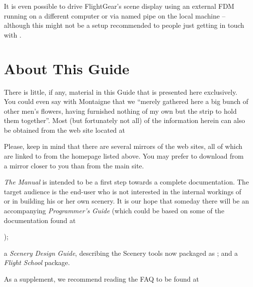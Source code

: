 It is even possible to drive FlightGear's scene display using an external
FDM running on a different computer or via named
pipe on the local machine -- although this might not be a
setup recommended to people just getting in touch with \FlightGear.


\section{About This Guide}

There is little, if any, material in this Guide that is presented here exclusively. You
could even say with Montaigne that we ``merely gathered here a big bunch of other men's
flowers, having furnished nothing of my own but the strip to hold them together''. Most
(but fortunately not all) of the information herein can also be obtained from the
\FlightGear{} web site located at
\medskip

\medskip

Please, keep in mind that there are several mirrors of the \FlightGear{} web sites, all
of which are linked to from the \FlightGear{} homepage listed above.
You may prefer to download \FlightGear{} from a mirror closer to you than from the
main site.

\textit{The \FlightGear{} Manual} is intended to be a first step
towards a complete \FlightGear{} documentation. The target audience is the end-user who is not
interested in the internal workings of  or in building
his or her own scenery. It is our hope that someday there will be an
accompanying \textit{\FlightGear{} Programmer's Guide} (which could be based on some of the documentation
found at
 \medskip

);
 \medskip

 \noindent
a \textit{\FlightGear{} Scenery Design Guide},
describing the Scenery tools now packaged as \TerraGear{}; and a \textit{\FlightGear{}
Flight School} package.
 \medskip

As a supplement, we recommend reading the \FlightGear{} FAQ to be found at

